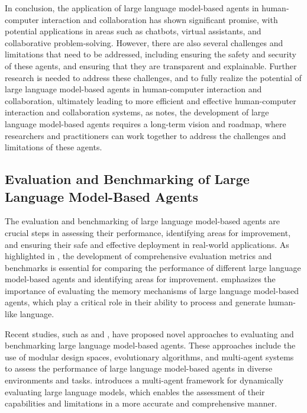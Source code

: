 \documentclass[11pt,a4paper]{article}
\begin{document}
In conclusion, the application of large language model-based agents in human-computer interaction and collaboration has shown significant promise, with potential applications in areas such as chatbots, virtual assistants, and collaborative problem-solving. However, there are also several challenges and limitations that need to be addressed, including ensuring the safety and security of these agents, and ensuring that they are transparent and explainable. Further research is needed to address these challenges, and to fully realize the potential of large language model-based agents in human-computer interaction and collaboration, ultimately leading to more efficient and effective human-computer interaction and collaboration systems, as \cite{arxiv:2501.11354} notes, the development of large language model-based agents requires a long-term vision and roadmap, where researchers and practitioners can work together to address the challenges and limitations of these agents.


\subsection{Evaluation and Benchmarking of Large Language Model-Based Agents}


The evaluation and benchmarking of large language model-based agents are crucial steps in assessing their performance, identifying areas for improvement, and ensuring their safe and effective deployment in real-world applications. As highlighted in \cite{arxiv:2308.03688}, the development of comprehensive evaluation metrics and benchmarks is essential for comparing the performance of different large language model-based agents and identifying areas for improvement. \cite{doi:10.1145/3748302} emphasizes the importance of evaluating the memory mechanisms of large language model-based agents, which play a critical role in their ability to process and generate human-like language.

Recent studies, such as \cite{arxiv:2410.06153} and \cite{arxiv:2406.04151}, have proposed novel approaches to evaluating and benchmarking large language model-based agents. These approaches include the use of modular design spaces, evolutionary algorithms, and multi-agent systems to assess the performance of large language model-based agents in diverse environments and tasks. \cite{arxiv:2402.11443} introduces a multi-agent framework for dynamically evaluating large language models, which enables the assessment of their capabilities and limitations in a more accurate and comprehensive manner.
\end{document}
